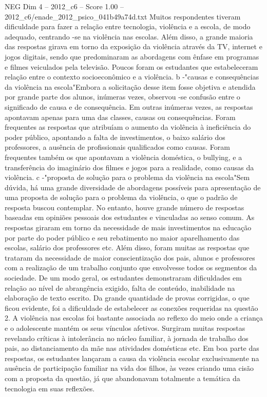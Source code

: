 \begin{textsample}{NEG Dim 4 – 2012\_c6 – Score 1.00 – 2012\_c6/enade\_2012\_psico\_041b49a74d.txt}
Muitos respondentes tiveram dificuldade para fazer a relação entre tecnologia, violência e a escola, de modo adequado, centrando -se na violência nas escolas.
Além disso, a grande maioria das respostas girava em torno da exposição da violência através da TV, internet e jogos digitais, sendo que predominaram as abordagens com ênfase em programas e filmes veiculados pela televisão.
Poucos foram os estudantes que estabeleceram relação entre o contexto socioeconômico e a violência. b -"causas e consequências da violência na escola"Embora a solicitação desse item fosse objetiva e atendida por grande parte dos alunos, inúmeras vezes, observou -se confusão entre o significado de causa e de consequência.
Em outras inúmeras vezes, as respostas apontavam apenas para uma das classes, causas ou consequências.
Foram frequentes as respostas que atribuíam o aumento da violência à ineficiência do poder público, apontando a falta de investimentos, o baixo salário dos professores, a ausência de profissionais qualificados como causas.
Foram frequentes também os que apontavam a violência doméstica, o bullying, e a transferência do imaginário dos filmes e jogos para a realidade, como causas da violência. c -"proposta de solução para o problema da violência na escola"Sem dúvida, há uma grande diversidade de abordagens possíveis para apresentação de uma proposta de solução para o problema da violência, o que o padrão de resposta buscou contemplar.
No entanto, houve grande número de respostas baseadas em opiniões pessoais dos estudantes e vinculadas ao senso comum.
As respostas giraram em torno da necessidade de mais investimentos na educação por parte do poder público e seu rebatimento no maior aparelhamento das escolas, salário dos professores etc.
Além disso, foram muitas as respostas que trataram da necessidade de maior conscientização dos pais, alunos e professores com a realização de um trabalho conjunto que envolvesse todos os segmentos da sociedade.
De um modo geral, os estudantes demonstraram dificuldades em relação ao nível de abrangência exigido, falta de conteúdo, inabilidade na elaboração de texto escrito.
Da grande quantidade de provas corrigidas, o que ficou evidente, foi a dificuldade de estabelecer as conexões requeridas na questão 2.
A violência nas escolas foi bastante associada ao reflexo do meio onde a criança e o adolescente mantém os seus vínculos afetivos.
Surgiram muitas respostas revelando críticas à intolerância no núcleo familiar, à jornada de trabalho dos pais, ao distanciamento da mãe nas atividades domésticas etc.
Em boa parte das respostas, os estudantes lançaram a causa da violência escolar exclusivamente na ausência de participação familiar na vida dos filhos, às vezes criando uma cisão com a proposta da questão, já que abandonavam totalmente a temática da tecnologia em suas reflexões.

\end{textsample}
